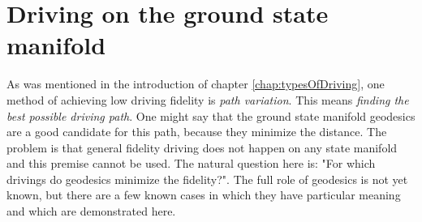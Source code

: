 























\section{Driving on the ground state manifold}
\label{chap:groundStateManifoldDriving}
As was mentioned in the introduction of chapter \ref{chap:typesOfDriving}, one method of achieving low driving fidelity is \emph{path variation}. This means \emph{finding the best possible driving path}. One might say that the ground state manifold geodesics are a good candidate for this path, because they minimize the distance. The problem is that general fidelity driving does not happen on any state manifold and this premise cannot be used. The natural question here is: "For which drivings do geodesics minimize the fidelity?". The full role of geodesics is not yet known, but there are a few known cases in which they have particular meaning and which are demonstrated here.


